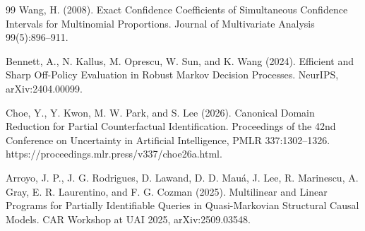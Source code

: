\documentclass{article}
\begin{document}
\begin{thebibliography}{99}
   Wang, H. (2008). Exact Confidence Coefficients of Simultaneous Confidence Intervals for Multinomial Proportions. Journal of Multivariate Analysis 99(5):896--911.

   Bennett, A., N. Kallus, M. Oprescu, W. Sun, and K. Wang (2024). Efficient and Sharp Off-Policy Evaluation in Robust Markov Decision Processes. NeurIPS, arXiv:2404.00099.

   Choe, Y., Y. Kwon, M. W. Park, and S. Lee (2026). Canonical Domain Reduction for Partial Counterfactual Identification. Proceedings of the 42nd Conference on Uncertainty in Artificial Intelligence, PMLR 337:1302--1326. https://proceedings.mlr.press/v337/choe26a.html.

   Arroyo, J. P., J. G. Rodrigues, D. Lawand, D. D. Mauá, J. Lee, R. Marinescu, A. Gray, E. R. Laurentino, and F. G. Cozman (2025). Multilinear and Linear Programs for Partially Identifiable Queries in Quasi-Markovian Structural Causal Models. CAR Workshop at UAI 2025, arXiv:2509.03548.

\end{thebibliography}
\end{document}
